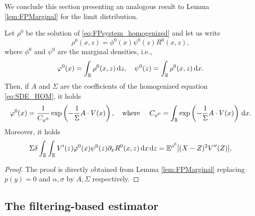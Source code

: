 \documentclass[10pt]{article}
\begin{document}
We conclude this section presenting an analogous result to Lemma \ref{lem:FPMarginal} for the limit distribution.

\begin{corollary}\label{lem:FPMarginal_Hom} Let $\rho^0$ be the solution of \eqref{eq:FPsystem_homogenized} and let us write 
	\begin{equation}
		\rho^0(x, z) = \phi^0(x)\psi^0(z)R^0(x,z),
	\end{equation}
	where $\phi^0$ and $\psi^0$ are the marginal densities, i.e., 
	\begin{equation}
		\varphi^0(x) = \int_{\mathbb{R}} \rho^0(x,z) \,\mathrm{d} z, \quad \psi^0(z) = \int_{\mathbb{R}} \rho^0(x,z) \,\mathrm{d} x.
	\end{equation}
	Then, if $A$ and $\Sigma$ are the coefficients of the homogenized equation \eqref{eq:SDE_HOM}, it holds
	\begin{equation}
		\varphi^0(x) = \frac{1}{C_{\varphi^0}} \exp\left(- \frac1{\Sigma} A\cdot V(x)\right), \quad \text{where } \quad C_{\varphi^0} = \int_{\mathbb{R}} \exp\left(- \frac1{\Sigma} A\cdot V(x) \right) \,\mathrm{d} x.
	\end{equation}
	Moreover, it holds
	\begin{equation}
		\Sigma \delta \int_{\mathbb{R}} \int_{\mathbb{R}} V'(z) \varphi^0(x) \psi^0(z) \partial_x R^0(x,z) \,\mathrm{d} x \,\mathrm{d} z = \operatorname{\mathbb{E}}^{\rho^0}[(X - Z)^2 V''(Z)].
	\end{equation}
\end{corollary}
\begin{proof} The proof is directly obtained from Lemma \ref{lem:FPMarginal} replacing $p(y)=0$ and $\alpha, \sigma$ by $A, \Sigma$ respectively. 
\end{proof}

\subsection{The filtering-based estimator}\label{sec:FilterMLE}
\end{document}
